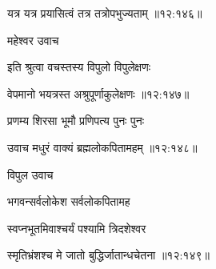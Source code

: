 
{\devanagarifont यत्र यत्र प्रयासित्वं तत्र तत्रोपभुज्यताम् {॥१२:१४६॥} \veg\dontdisplaylinenum }%

{\devanagarifont महेश्वर उवाच {\dandab}\dontdisplaylinenum  }%
 
{\devanagarifont इति श्रुत्वा वचस्तस्य विपुलो विपुलेक्षणः \thinspace{\danda} \dontdisplaylinenum }%


{\devanagarifont वेपमानो भयत्रस्त अश्रुपूर्णाकुलेक्षणः {॥१२:१४७॥} \veg\dontdisplaylinenum }%

{\devanagarifont प्रणम्य शिरसा भूमौ प्रणिपत्य पुनः पुनः \thinspace{\dandab} \dontdisplaylinenum }%


{\devanagarifont उवाच मधुरं वाक्यं ब्रह्मलोकपितामहम् {॥१२:१४८॥} \veg\dontdisplaylinenum }%

{\devanagarifont विपुल उवाच {\dandab}\dontdisplaylinenum  }%
 
{\devanagarifont भगवन्सर्वलोकेश सर्वलोकपितामह \thinspace{\danda} \dontdisplaylinenum }%
 
{\devanagarifont स्वप्नभूतमिवाश्चर्यं पश्यामि त्रिदशेश्वर  \danda\dontdisplaylinenum }%


{\devanagarifont स्मृतिभ्रंशश्च मे जातो बुद्धिर्जातान्धचेतना {॥१२:१४९॥} \veg\dontdisplaylinenum }%

